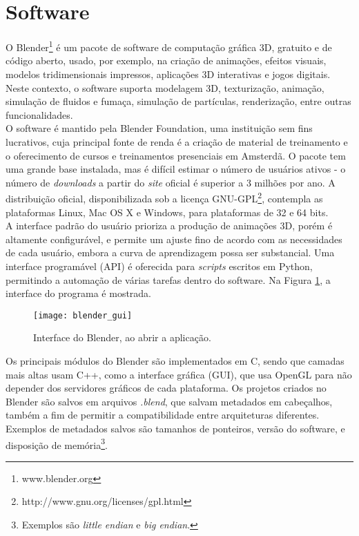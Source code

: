 
\section{Software}
O Blender\footnote{www.blender.org} é um pacote de software de computação gráfica 3D, gratuito e de código aberto, usado, por exemplo, na criação de animações, efeitos visuais, modelos tridimensionais impressos, aplicações 3D interativas e jogos digitais. Neste contexto, o software suporta modelagem 3D, texturização, animação, simulação de fluidos e fumaça, simulação de partículas, renderização, entre outras funcionalidades. \\

O software é mantido pela Blender Foundation, uma instituição sem fins lucrativos, cuja principal fonte de renda é a criação de material de treinamento e o oferecimento de cursos e treinamentos presenciais em Amsterdã. O pacote tem uma grande base instalada, mas é difícil estimar o número de usuários ativos - o número de {\it downloads} a partir do {\it site} oficial é superior a 3 milhões por ano. A distribuição oficial, disponibilizada sob a licença GNU-GPL\footnote{http://www.gnu.org/licenses/gpl.html}, contempla as plataformas Linux, Mac OS X e Windows, para plataformas de 32 e 64 bits. \\

A interface padrão do usuário prioriza a produção de animações 3D, porém é altamente configurável, e permite um ajuste fino de acordo com as necessidades de cada usuário, embora a curva de aprendizagem possa ser substancial. Uma interface programável (API) é oferecida para {\it scripts} escritos em Python, permitindo a automação de várias tarefas dentro do software. Na Figura \ref{blender_gui}, a interface do programa é mostrada. \\ 

\begin{figure}[!htb]
\center
\texttt{[image: blender\_gui]}
\caption{Interface do Blender, ao abrir a aplicação.}
\label{blender_gui}
\end{figure}

Os principais módulos do Blender são implementados em C, sendo que camadas mais altas usam C++, como a interface gráfica (GUI), que usa OpenGL para não depender dos servidores gráficos de cada plataforma. Os projetos criados no Blender são salvos em arquivos {\it *.blend}, que salvam metadados em cabeçalhos, também a fim de permitir a compatibilidade entre arquiteturas diferentes. Exemplos de metadados salvos são tamanhos de ponteiros, versão do software, e disposição de memória\footnote{Exemplos são {\it little endian} e {\it big endian}.}.

